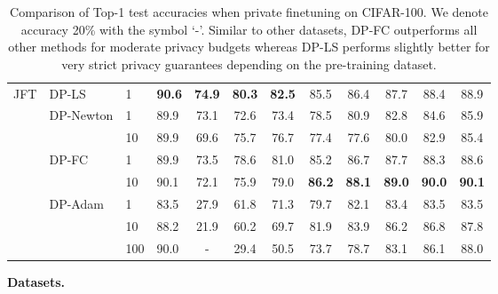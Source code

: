 \documentclass[letterpaper]{article} \usepackage{fullpage}
\begin{document}
\begin{table*}[!h]
\begin{tabular}{llll|cccccccc}
		\multirow{8}{*}{JFT} & \multirow{ 1}{*}{DP-LS}
		                                        & 1 & \textbf{90.6} & \textbf{74.9} & \textbf{80.3} & \textbf{82.5} & 85.5 & 86.4 & 87.7 & 88.4 & 88.9 \\ \addlinespace[0.1cm]
\addlinespace[0.1cm]
		            & \multirow{ 2}{*}{DP-Newton} & 1      & 89.9        & 73.1 & 72.6 & 73.4 & 78.5 & 80.9 & 82.8 & 84.6 & 85.9                    \\
		            &                             & 10     & 89.9        & 69.6 & 75.7 & 76.7 & 77.4 & 77.6 & 80.0 & 82.9 & 85.4                    \\
		\addlinespace[0.1cm]
\addlinespace[0.1cm]
		            & \multirow{ 2}{*}{DP-FC}     & 1      & 89.9        & 73.5 & 78.6 & 81.0 & 85.2 & 86.7 & 87.7 & 88.3 & 88.6                    \\
		            &                             & 10     & 90.1        & 72.1 & 75.9 & 79.0 & \textbf{86.2} & \textbf{88.1} & \textbf{89.0} & \textbf{90.0} & \textbf{90.1}                    \\
		\addlinespace[0.1cm]
\addlinespace[0.1cm]
		            & \multirow{ 3}{*}{DP-Adam}   & 1      & 83.5        & 27.9 & 61.8 & 71.3 & 79.7 & 82.1 & 83.4 & 83.5 & 83.5                    \\
		            &                             & 10     & 88.2        & 21.9 & 60.2 & 69.7 & 81.9 & 83.9 & 86.2 & 86.8 & 87.8                    \\
		            &                             & 100    & 90.0        & -   & 29.4 & 50.5 & 73.7 & 78.7 & 83.1 & 86.1 & 88.0                    \\
\bottomrule
	\end{tabular}
	\caption{Comparison of Top-1 test accuracies when private finetuning on CIFAR-100. We denote accuracy  20\% with the symbol `-'.  Similar to other datasets, DP-FC outperforms all other methods for moderate privacy budgets whereas DP-LS performs slightly better for very strict privacy guarantees depending on the pre-training dataset.}
	\label{tab:cifar100}
\end{table*}
\textbf{Datasets.} 
\end{document}

